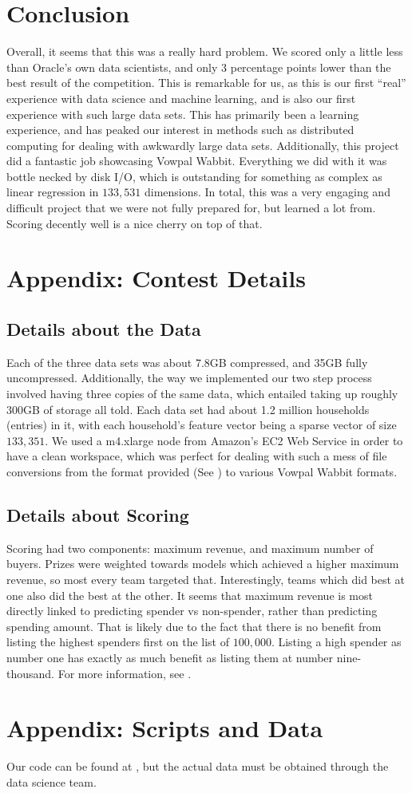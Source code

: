 \documentclass{article}
\begin{document}
\section*{Conclusion}
Overall, it seems that this was a really hard problem. We scored only a little less than Oracle's own data scientists, and only 3 percentage points lower than the best result of the competition. This is remarkable for us, as this is our first ``real'' experience with data science and machine learning, and is also our first experience with such large data sets. This has primarily been a learning experience, and has peaked our interest in methods such as distributed computing for dealing with awkwardly large data sets. Additionally, this project did a fantastic job showcasing Vowpal Wabbit. Everything we did with it was bottle necked by disk I/O, which is outstanding for something as complex as linear regression in $133,531$ dimensions. In total, this was a very engaging and difficult project that we were not fully prepared for, but learned a lot from. Scoring decently well is a nice cherry on top of that. 


\section{Appendix: Contest Details}
\label{sec:app1}
\subsection*{Details about the Data}
Each of the three data sets was about 7.8GB compressed, and 35GB fully uncompressed. Additionally, the way we implemented our two step process involved having three copies of the same data, which entailed taking up roughly 300GB of storage all told. Each data set had about 1.2 million households (entries) in it, with each household's feature vector being a sparse vector of size $133,351$. We used a m4.xlarge node from Amazon's EC2 Web Service in order to have a clean workspace, which was perfect for dealing with such a mess of file conversions from the format provided (See \citet{codata_oracle_2016}) to various Vowpal Wabbit formats. 

\subsection*{Details about Scoring}
Scoring had two components: maximum revenue, and maximum number of buyers. Prizes were weighted towards models which achieved a higher maximum revenue, so most every team targeted that. Interestingly, teams which did best at one also did the best at the other. It seems that maximum revenue is most directly linked to predicting spender vs non-spender, rather than predicting spending amount. That is likely due to the fact that there is no benefit from listing the highest spenders first on the list of $100,000$. Listing a high spender as number one has exactly as much benefit as listing them at number nine-thousand. For more information, see \citealt{codata_oracle_2016}.

\section{Appendix: Scripts and Data}
Our code can be found at \citeauthor{cuthbertson_scuthbert/oracleaudiencecompetition_2016}, but the actual data must be obtained through the data science team.  

\newpage


\end{document}
